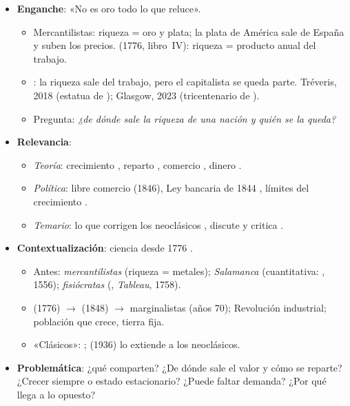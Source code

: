 \documentclass{article}
\begin{document}
\cabecerarepaso
\begin{columnas}

\begin{itemize}
\item \textbf{Enganche}: «No es oro todo lo que reluce».
  \begin{itemize}
  \item Mercantilistas: riqueza = oro y plata; la plata de América sale de España y suben los precios.  (1776, libro~IV): riqueza = producto anual del trabajo.
  \item {}: la riqueza sale del trabajo, pero el capitalista se queda parte. Tréveris, 2018 (estatua de ); Glasgow, 2023 (tricentenario de ).
  \item Pregunta: \emph{¿de dónde sale la riqueza de una nación y quién se la queda?}
  \end{itemize}
\item \textbf{Relevancia}:
  \begin{itemize}
  \item \emph{Teoría}: crecimiento , reparto , comercio , dinero .
  \item \emph{Política}: libre comercio (1846), Ley bancaria de 1844 , límites del crecimiento .
  \item \emph{Temario}: lo que corrigen los neoclásicos , discute   y critica .
  \end{itemize}
\item \textbf{Contextualización}: ciencia desde 1776 .
  \begin{itemize}
  \item Antes: \emph{mercantilistas} (riqueza = metales); \emph{Salamanca} (cuantitativa: , 1556); \emph{fisiócratas} (, \emph{Tableau}, 1758).
  \item {} (1776) $\to$  (1848) $\to$ marginalistas (años 70); Revolución industrial; población que crece, tierra fija.
  \item «Clásicos»: ;  (1936) lo extiende a los neoclásicos.
  \end{itemize}
\item \textbf{Problemática}: ¿qué comparten? ¿De dónde sale el valor y cómo se reparte? ¿Crecer siempre o estado estacionario? ¿Puede faltar demanda? ¿Por qué  llega a lo opuesto?

\end{itemize}
\end{columnas}
\end{document}
